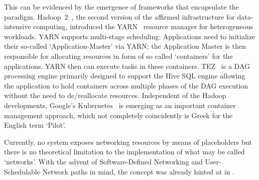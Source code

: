 \documentclass{sig-alternate}
\begin{document}


This can be evidenced by the emergence of frameworks that encapsulate the \pilot
paradigm. Hadoop~2~\cite{hadoop_url}, the second version of the affirmed
infrastructure for data-intensive computing,
introduced the YARN~\cite{vavilapalli2013apache} resource manager for
heterogeneous workloads.
YARN supports multi-stage scheduling: Applications need to initialize their
so-called `Application-Master' via YARN; the Application Master is then
responsible for allocating resources in form of so called `containers' for the
applications. YARN then can execute tasks in these containers.
TEZ~\cite{tez_url} is a DAG processing engine primarily designed to support the
Hive SQL engine allowing the application to hold containers across multiple
phases of the DAG execution without the need to de/reallocate
resources.
Independent of the Hadoop developments, Google's
Kubernetes~\cite{bernstein2014containers} is emerging as an important container
management approach, which not completely coincidently is Greek for the English
term `Pilot'.

Currently, no \pilot system exposes networking resources by means of
placeholders but there is no theoretical limitation to the implementation of
what may be called `\pilot networks'. With the advent of Software-Defined
Networking and User-Schedulable Network paths in mind, the concept was already
hinted at in \cite{santcroos2012}.


%
\end{document}
